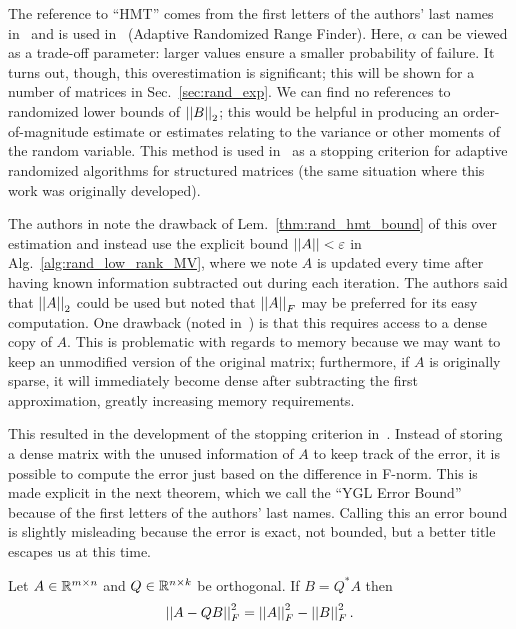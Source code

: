 \noindent
The reference to ``HMT'' comes from the first letters of
the authors' last names in~\cite{RandomReview2011}
and is used in~\cite[Alg.~4.2]{RandomReview2011}
(Adaptive Randomized Range Finder).
Here, $\alpha$ can be viewed as a trade-off parameter: larger values
ensure a smaller probability of failure.
It turns out, though, this overestimation is significant; this will
be shown for a number of matrices in Sec.~\ref{sec:rand_exp}.
We can find no references to randomized lower bounds of $\left| \left| B \right| \right|_{2}$;
this would be helpful in producing an order-of-magnitude estimate
or estimates relating to the variance or other moments of the random variable.
This method is used in~\cite{liu2016parallel,xi2014fast,saibaba2016randomized}
as a stopping criterion for adaptive randomized algorithms
for structured matrices
(the same situation where this work was originally developed).

The authors in \cite{martinsson2016randomized} note the drawback of
Lem.~\ref{thm:rand_hmt_bound} of this over estimation and instead
use the explicit bound $\left| \left| A \right| \right|<\varepsilon$ in Alg.~\ref{alg:rand_low_rank_MV},
where we note $A$ is updated every time after having known
information subtracted out during each iteration.
The authors said that $\left| \left| A \right| \right|_{2}$ could be used but noted
that $\left| \left| A \right| \right|_{F}$ may be preferred for its easy computation.
One drawback (noted in~\cite{yu2018efficient}) is that this requires 
access to a dense copy of $A$.
This is problematic with regards to memory because we may
want to keep an unmodified version of the original matrix; furthermore,
if $A$ is originally sparse, it will immediately become dense
after subtracting the first approximation,
greatly increasing memory requirements.

This resulted in the development of the stopping criterion
in~\cite{yu2018efficient}.
Instead of storing a dense matrix with the unused information
of $A$ to keep track of the error, it is possible to compute
the error just based on the difference in F-norm.
This is made explicit in the next theorem, which we call
the ``YGL Error Bound'' because of the first letters
of the authors' last names.
Calling this an error bound is slightly misleading because the
error is exact, not bounded, but a better title escapes us at this time.

\begin{thm}
\label{thm:rand_ygl_bound}
Let $A\in\mathbb{R}^{m\times n}$ and $Q\in\mathbb{R}^{n\times k}$ be orthogonal.
If $B = Q^{*}A$ then
%
\begin{equation}
    \left| \left| A - QB \right| \right|_{F}^{2} = \left| \left| A \right| \right|_{F}^{2} - \left| \left| B \right| \right|_{F}^{2}.
    \label{eq:rand_ygl_bound}
\end{equation}
\end{thm}

